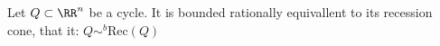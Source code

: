 

    Let $Q\subset \RR^n$ be a cycle. It is bounded rationally equivallent to its recession cone, that it: $Q\sim^b \text{Rec}(Q)$

